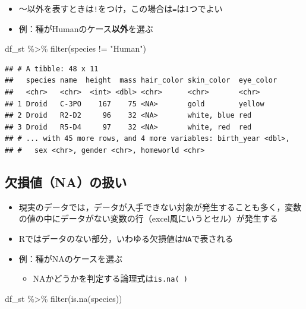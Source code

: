 \documentclass[
  xelatex,ja=standard, b5paper]{bxjsbook}
\newenvironment{Shaded}{\begin{snugshade}}{\end{snugshade}}
\newcommand{\FunctionTok}[1]{\textcolor[rgb]{0.00,0.00,0.00}{#1}}
\newcommand{\NormalTok}[1]{#1}
\newcommand{\SpecialCharTok}[1]{\textcolor[rgb]{0.00,0.00,0.00}{#1}}
\newcommand{\StringTok}[1]{\textcolor[rgb]{0.31,0.60,0.02}{#1}}
\providecommand{\tightlist}{%
  \setlength{\itemsep}{0pt}\setlength{\parskip}{0pt}}
\begin{document}
\begin{itemize}
\tightlist
\item
  ～以外を表すときは\texttt{!}をつけ，この場合は\texttt{=}は1つでよい
\item
  例：種がHumanのケース\textbf{以外}を選ぶ
\end{itemize}

\begin{Shaded}
\begin{Highlighting}[]
\NormalTok{df\_st }\SpecialCharTok{\%\textgreater{}\%} 
  \FunctionTok{filter}\NormalTok{(species }\SpecialCharTok{!=} \StringTok{"Human"}\NormalTok{)}
\end{Highlighting}
\end{Shaded}

\begin{verbatim}
## # A tibble: 48 x 11
##   species name  height  mass hair_color skin_color  eye_color
##   <chr>   <chr>  <int> <dbl> <chr>      <chr>       <chr>    
## 1 Droid   C-3PO    167    75 <NA>       gold        yellow   
## 2 Droid   R2-D2     96    32 <NA>       white, blue red      
## 3 Droid   R5-D4     97    32 <NA>       white, red  red      
## # ... with 45 more rows, and 4 more variables: birth_year <dbl>,
## #   sex <chr>, gender <chr>, homeworld <chr>
\end{verbatim}

\hypertarget{filter-st-na}{%
\subsection{欠損値（NA）の扱い}\label{filter-st-na}}

\begin{itemize}
\item
  現実のデータでは，データが入手できない対象が発生することも多く，変数の値の中にデータがない変数の行（excel風にいうとセル）が発生する
\item
  Rではデータのない部分，いわゆる欠損値は\texttt{NA}で表される
\item
  例：種がNAのケースを選ぶ

  \begin{itemize}
  \tightlist
  \item
    NAかどうかを判定する論理式は\texttt{is.na(\ )}
  \end{itemize}
\end{itemize}

\begin{Shaded}
\begin{Highlighting}[]
\NormalTok{df\_st }\SpecialCharTok{\%\textgreater{}\%} 
  \FunctionTok{filter}\NormalTok{(}\FunctionTok{is.na}\NormalTok{(species))}
\end{Highlighting}
\end{Shaded}
\end{document}
